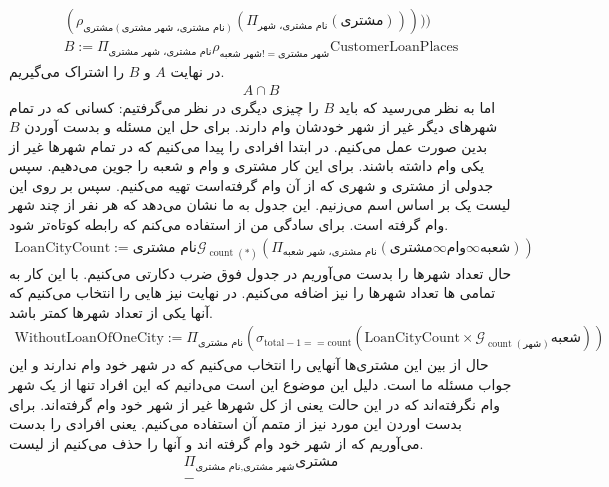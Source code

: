 \begin{enumerate}
\begin{gather*}
        \\(\rho_{\text{مشتری}(\text{نام مشتری، شهر مشتری})}(\Pi_{\text{نام مشتری، شهر}}(\text{مشتری})))))
        \\
        B := \Pi_\text{نام مشتری، شهر مشتری} \rho_{\text{شهر شعبه} != \text{شهر مشتری}} \text{CustomerLoanPlaces}
    \end{gather*}
    در نهایت $A$ و $B$ را اشتراک می‌گیریم.
    \begin{gather*}
        A \cap B
    \end{gather*}
    اما به نظر می‌رسید که باید
    $B$
    را چیزی دیگری در نظر می‌گرفتیم:
    کسانی که در تمام شهر‌های دیگر غیر از شهر خودشان وام دارند. برای حل این مسئله و بدست آوردن
    $B$
    بدین صورت عمل می‌کنیم. در ابتدا افرادی را پیدا می‌کنیم که در تمام شهر‌ها غیر از یکی وام داشته باشند.
    برای این کار مشتری و وام و شعبه را جوین می‌دهیم. سپس جدولی از مشتری و شهری که از آن وام گرفته‌است تهیه می‌کنیم.
    سپس بر روی این لیست یک
    بر اساس اسم می‌زنیم. این جدول به ما نشان می‌دهد که هر نفر از چند شهر وام گرفته است.
    برای سادگی من از
    استفاده می‌کنم که رابطه کوتاه‌تر شود.
    \begin{gather*}
        \text{LoanCityCount} := \text{نام مشتری} \mathcal{G}_{\operatorname{count}(*)} (\Pi_{\text{نام مشتری، شهر شعبه}} (\text{مشتری} \infty \text{وام} \infty \text{شعبه}))
    \end{gather*}
    حال تعداد شهر‌ها را بدست می‌آوریم در جدول فوق ضرب دکارتی می‌کنیم. با این کار به تمامی
    ها
    تعداد شهر‌ها را نیز اضافه می‌کنیم. در نهایت نیز
    هایی
    را انتخاب می‌کنیم که
    آنها یکی از تعداد شهر‌ها کمتر باشد.
    \begin{gather*}
        \text{WithoutLoanOfOneCity} := \Pi_{\text{نام مشتری}} (\sigma_{\text{total} - 1 == \text{count}} (\text{LoanCityCount} \times \mathcal{G}_{\operatorname{count}(\text{شهر})} \text{شعبه}))
    \end{gather*}
    حال از بین این مشتری‌ها آنهایی را انتخاب می‌کنیم که در شهر خود وام ندارند و این جواب مسئله ما است. دلیل
    این موضوع این است می‌دانیم که این افراد تنها از یک شهر وام نگرفته‌اند که در این حالت یعنی از کل شهر‌ها
    غیر از شهر خود وام گرفته‌اند. برای بدست اوردن این مورد نیز از متمم آن استفاده می‌کنیم. یعنی افرادی را بدست
    می‌آوریم که از شهر خود وام گرفته اند و آنها را حذف می‌کنیم از لیست.
    \begin{gather*}
        \Pi_{\text{نام مشتری}, \text{شهر مشتری}} \text{مشتری}
        \\
        -

\end{gather*}
\end{enumerate}
